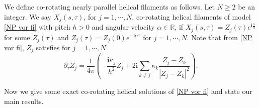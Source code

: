 \documentclass[12pt,reqno]{amsart}
\numberwithin{equation}{section}
\theoremstyle{definition}
\theoremstyle{remark}
\begin{document}

We define co-rotating nearly parallel helical filaments as follows. Let $ N\geq 2 $ be an integer. We say $ X_j(s, \tau) $, for $ j=1,\cdots,N $,  co-rotating helical filaments of model \eqref{NP vor fi} with pitch $ h>0 $ and angular velocity $ \alpha\in\mathbb{R} $, if $ X_j(s, \tau)=Z_j(\tau)e^{\mathbf{i}\frac{s}{h}} $ for some $ Z_j(\tau) $ and $   Z_j(\tau)=  Z_j(0)e^{-\mathbf{i}\alpha\tau} $ for $ j=1,\cdots,N $. %
Note that from \eqref{NP vor fi}, $ Z_j $ satisfies for $ j=1,\cdots,N $
\begin{equation}\label{NP heli vor}
\partial_\tau Z_j=\frac{1}{4\pi}\left(-\frac{\mathbf{i}\kappa_j}{h^2}Z_j+2\mathbf{i}\sum_{k\neq j}\kappa_k\frac{Z_j-Z_k}{|Z_j-Z_k|^2} \right).
\end{equation} 

Now we give some exact co-rotating helical solutions of \eqref{NP vor fi} and state our main results.
\end{document}
